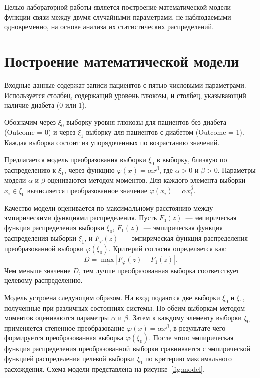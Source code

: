 \documentclass[a4paper, 14pt]{extarticle}
\begin{document}
Целью лабораторной работы является построение математической модели функции связи между двумя случайными параметрами, не наблюдаемыми одновременно, на основе анализа их статистических распределений.

\section{Построение математической модели}

Входные данные содержат записи пациентов с пятью числовыми параметрами. Используется столбец, содержащий уровень глюкозы, и столбец, указывающий наличие диабета (0 или 1).

Обозначим через $\xi_0$ выборку уровня глюкозы для пациентов без диабета (Outcome = 0) и через $\xi_1$ выборку для пациентов с диабетом (Outcome = 1). Каждая выборка состоит из упорядоченных по возрастанию значений.

Предлагается модель преобразования выборки $\xi_0$ в выборку, близкую по распределению к $\xi_1$, через функцию $\varphi(x) = \alpha x^{\beta}$, где $\alpha > 0$ и $\beta > 0$. Параметры модели $\alpha$ и $\beta$ оцениваются методом моментов. Для каждого элемента выборки $x_i \in \xi_0$ вычисляется преобразованное значение $\varphi(x_i) = \alpha x_i^{\beta}$.

Качество модели оценивается по максимальному расстоянию между эмпирическими функциями распределения. Пусть $F_0(z)$~--- эмпирическая функция распределения выборки $\xi_0$, $F_1(z)$~--- эмпирическая функция распределения выборки $\xi_1$, и $F_\varphi(z)$~--- эмпирическая функция распределения преобразованной выборки $\varphi(\xi_0)$. Критерий согласия определяется как:
\begin{equation}
D = \max_z \left| F_\varphi(z) - F_1(z) \right|.
\end{equation}
Чем меньше значение $D$, тем лучше преобразованная выборка соответствует целевому распределению.

Модель устроена следующим образом. На вход подаются две выборки $\xi_0$ и $\xi_1$, полученные при различных состояниях системы. По обеим выборкам методом моментов оцениваются параметры $\alpha$ и $\beta$. Затем к каждому элементу выборки $\xi_0$ применяется степенное преобразование $\varphi(x) = \alpha x^{\beta}$, в результате чего формируется преобразованная выборка $\varphi(\xi_0)$. После этого эмпирическая функция распределения преобразованной выборки сравнивается с эмпирической функцией распределения целевой выборки $\xi_1$ по критерию максимального расхождения. Схема модели представлена на рисунке~\ref{fig:model}.
\end{document}
